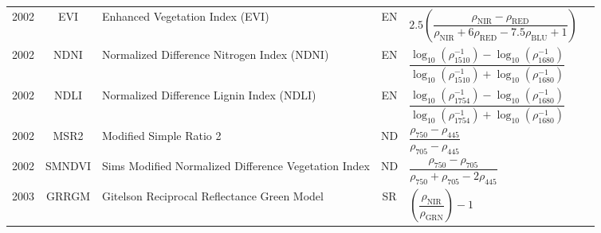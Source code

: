 \documentclass[10pt]{article}
\begin{document}
\begin{ThreePartTable}
\begin{longtable}{c c m{2.3in} c M{2.8in} M{1.5in}}
  2002 & EVI     & Enhanced Vegetation Index (EVI)                                                & EN & $2.5\left(\dfrac{\rho_\text{NIR}-\rho_\text{RED}}{\rho_\text{NIR}+6\rho_\text{RED}-7.5\rho_\text{BLU} + 1}\right)$                                                                                                                                                                      & \citet{Huete2002}                                   \\
  2002 & NDNI    & Normalized Difference Nitrogen Index (NDNI)                                    & EN & $\dfrac{\log_{10}({\rho^{-1}_{1510}})-\log_{10}({\rho^{-1}_{1680}})}{\log_{10}({\rho^{-1}_{1510}})+\log_{10}({\rho^{-1}_{1680}})}$                                                                                                                                                      & \citet{Serrano2002}                                 \\
  2002 & NDLI    & Normalized Difference Lignin Index (NDLI)                                      & EN & $\dfrac{\log_{10}({\rho^{-1}_{1754}})-\log_{10}({\rho^{-1}_{1680}})}{\log_{10}({\rho^{-1}_{1754}})+\log_{10}({\rho^{-1}_{1680}})}$                                                                                                                                                      & \citet{Serrano2002}                                 \\
  2002 & MSR2    & Modified Simple Ratio 2                                                        & ND & $\dfrac{\rho_{750}-\rho_{445}}{\rho_{705}-\rho_{445}}$                                                                                                                                                                                                                                  & \citet{Sims2002}                                    \\
  2002 & SMNDVI  & Sims Modified Normalized Difference Vegetation Index                           & ND & $\dfrac{\rho_{750}-\rho_{705}}{\rho_{750}+\rho_{705}-2\rho_{445}}$                                                                                                                                                                                                                      & \citet{Sims2002}                                    \\
  2003 & GRRGM   & Gitelson Reciprocal Reflectance Green Model                                    & SR & $\left(\dfrac{\rho_\text{NIR}}{\rho_\text{GRN}}\right)-1$                                                                                                                                                                                                                               & \citet{Gitelson2003,Gitelson2005}                   \\

\end{longtable}
\end{ThreePartTable}
\end{document}
